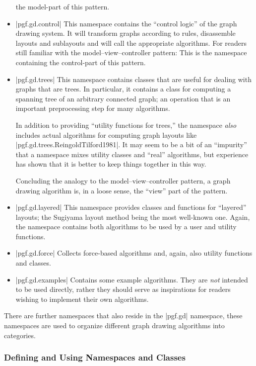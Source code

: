 \begin{itemize}
  the model-part of this pattern.
\item |pgf.gd.control| This namespace contains the ``control logic''
  of the graph drawing system. It will transform graphs according to
  rules, disassemble layouts and sublayouts and will call the
  appropriate algorithms. For readers still familiar with the
  model--view--controller pattern: This is the namespace containing
  the control-part of this pattern. 
\item |pgf.gd.trees| This namespace contains classes that are useful
  for dealing with graphs that are trees. In particular, it contains a
  class for computing a spanning tree of an arbitrary connected graph;
  an operation that is an important preprocessing step for many
  algorithms.

  In addition to providing ``utility functions for trees,'' the
  namespace \emph{also} includes actual algorithms for computing graph
  layouts like |pgf.gd.trees.ReingoldTilford1981|. It may seem to be a
  bit of an ``impurity'' that a namespace mixes utility classes and
  ``real'' algorithms, but experience has shown that it is better to
  keep things together in this way.

  Concluding the analogy to the model--view--controller pattern, a
  graph drawing algorithm is, in a loose sense, the ``view'' part of
  the pattern.
\item |pgf.gd.layered| This namespace provides classes and functions
  for ``layered'' layouts; the Sugiyama layout method being the most
  well-known one. Again, the namespace contains both algorithms to be
  used by a user and utility functions.
\item |pgf.gd.force| Collects force-based algorithms and, again, also
  utility functions and classes.
\item |pgf.gd.examples| Contains some example algorithms. They are
  \emph{not} intended to be used directly, rather they should serve as
  inspirations for readers wishing to implement their own algorithms.
\end{itemize}

There are further namespaces that also reside in the |pgf.gd|
namespace, these namespaces are used to organize different graph
drawing algorithms into categories.


\subsubsection{Defining and Using Namespaces and Classes}

